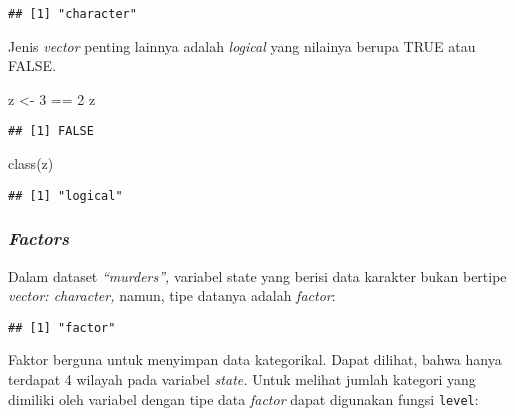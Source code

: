 \documentclass[
]{article}
\newenvironment{Shaded}{\begin{snugshade}}{\end{snugshade}}
\newcommand{\DecValTok}[1]{\textcolor[rgb]{0.00,0.00,0.81}{#1}}
\newcommand{\FunctionTok}[1]{\textcolor[rgb]{0.00,0.00,0.00}{#1}}
\newcommand{\NormalTok}[1]{#1}
\newcommand{\OtherTok}[1]{\textcolor[rgb]{0.56,0.35,0.01}{#1}}
\newcommand{\SpecialCharTok}[1]{\textcolor[rgb]{0.00,0.00,0.00}{#1}}
\begin{document}
\begin{verbatim}
## [1] "character"
\end{verbatim}

Jenis \emph{vector} penting lainnya adalah \emph{logical} yang nilainya
berupa TRUE atau FALSE.

\begin{Shaded}
\begin{Highlighting}[]
\NormalTok{z }\OtherTok{\textless{}{-}} \DecValTok{3} \SpecialCharTok{==} \DecValTok{2} 
\NormalTok{z }
\end{Highlighting}
\end{Shaded}

\begin{verbatim}
## [1] FALSE
\end{verbatim}

\begin{Shaded}
\begin{Highlighting}[]
\FunctionTok{class}\NormalTok{(z) }
\end{Highlighting}
\end{Shaded}

\begin{verbatim}
## [1] "logical"
\end{verbatim}

\hypertarget{factors}{%
\subsubsection{\texorpdfstring{\emph{Factors}}{Factors}}\label{factors}}

Dalam dataset \emph{``murders'',} variabel state yang berisi data
karakter bukan bertipe \emph{vector: character,} namun, tipe datanya
adalah \emph{factor}:

\begin{Shaded}
\end{Shaded}

\begin{verbatim}
## [1] "factor"
\end{verbatim}

Faktor berguna untuk menyimpan data kategorikal. Dapat dilihat, bahwa
hanya terdapat 4 wilayah pada variabel \emph{state.} Untuk melihat
jumlah kategori yang dimiliki oleh variabel dengan tipe data
\emph{factor} dapat digunakan fungsi \texttt{level}:
\end{document}

